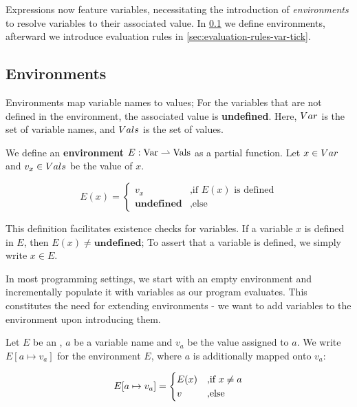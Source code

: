 Expressions now feature variables, necessitating the introduction of \emph{environments} to resolve variables to their associated value. In \cref{sec:environments} we define environments, afterward we introduce evaluation rules in \cref{sec:evaluation-rules-var-tick}.

\subsection{Environments}\label{sec:environments}

Environments map variable names to values; For the variables that are not defined in the environment, the associated value is \textbf{undefined}. Here, \(Var\) is the set of variable names, and \(Vals\) is the set of values. 

\begin{definition}[Environment]\label{def:environment}
   We define an \textbf{environment} \(E: \text{Var} \rightharpoonup \text{Vals}\) as a partial function. Let \(x \in Var\) and \(v_x \in Vals\) be the value of \(x\).

   \[
      E(x) =
      \begin{cases}
	 v_x		    & \mbox{,if } E(x) \text{ is defined} \\
	 \textbf{undefined} &\mbox{,else}
      \end{cases}
   \]
\end{definition}

This definition facilitates existence checks for variables. If a variable \(x\) is defined in \(E\), then \(E(x) \neq \textbf{undefined}\); To assert that a variable is defined, we simply write \(x \in E\).

In most programming settings, we start with an empty environment and incrementally populate it with variables as our program evaluates. This constitutes the need for extending environments - we want to add variables to the environment upon introducing them.

\begin{definition}\label{def:environment-augment}	
   Let \(E\) be an , \(a\) be a variable name and \(v_a\) be the value assigned to \(a\). We write \(E[a \mapsto v_a]\) for the environment \(E\), where \(a\) is additionally mapped onto \(v_a\):

   \[
      E[a \mapsto v_a] = 
      \begin{cases}
	 E(x)  & \mbox{,if } x \neq a\\
	 v     & \mbox{,else } 
      \end{cases}
   \]

\end{definition}

